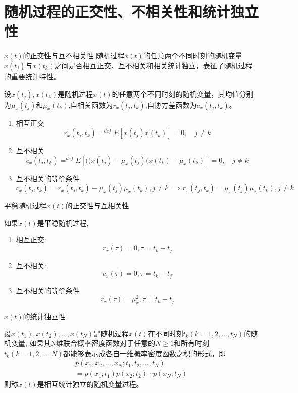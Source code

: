 \section{随机过程的正交性、不相关性和统计独立性}

\begin{frame}{$x(t)$的正交性与互不相关性}
随机过程$x(t)$的任意两个不同时刻的随机变量$x(t_j)$与$x(t_k)$之间是否相互正交、互不相关和相关统计独立，表征了随机过程的重要统计特性。
\begin{definition}
	设$x(t_j),x(t_k)$是随机过程$x(t)$的任意两个不同时刻的随机变量，其均值分别为$\mu_x(t_j)$和$\mu_x(t_k)$,自相关函数为$r_x(t_j,t_k)$,自协方差函数为$c_x(t_j,t_k)$。
	\begin{enumerate}
		\item 相互正交
		$$r_x(t_j,t_k)\mathop{=}^{def}E[x(t_j)x(t_k)]=0, \quad j\ne k$$
		\item 互不相关
		$$c_x(t_j,t_k)\mathop{=}^{def}E[((x(t_j)-\mu_x(t_j)(x(t_k)-\mu_x(t_k)]=0, \quad j\ne k$$
		\item 互不相关的等价条件
		$$c_x(t_j,t_k)=r_x(t_j,t_k)-\mu_x(t_j)\mu_x(t_k), j\ne k \implies r_x(t_j,t_k)=\mu_x(t_j)\mu_x(t_k),j\ne k $$
	\end{enumerate}
	
\end{definition}
\end{frame}

\begin{frame}{平稳随机过程$x(t)$的正交性与互相关性}
\begin{definition}[]
如果$x(t)$是平稳随机过程,
\begin{enumerate}
	\item 相互正交:
	\[r_x(\tau)=0,\tau=t_k-t_j\]
	\item 互不相关:
	\[c_x(\tau)=0,\tau=t_k-t_j\]
	\item
	互不相关的等价条件
	\[r_x(\tau)=\mu_x^2,\tau=t_k-t_j\]
\end{enumerate}
\end{definition}
\end{frame}

\begin{frame}{$x(t)$的统计独立性}
\begin{definition}[]
设$x(t_1),x(t_2),\dots,x(t_N)$是随机过程$x(t)$在不同时刻$t_k(k=1,2,\dots,t_N)$的随机变量, 如果其N维联合概率密度函数对于任意的$N\ge 1$和所有时刻$t_k(k=1,2,\dots,N)$都能够表示成各自一维概率密度函数之积的形式，即
\begin{align*}
p(x_1,x_2,\dots,x_N; t_1,t_2,\dots,t_N)\\
=p(x_1;t_1)p(x_2;t_2)\cdots p(x_N;t_N)
\end{align*}
则称$x(t)$是相互统计独立的随机变量过程。
\end{definition}
\end{frame}

